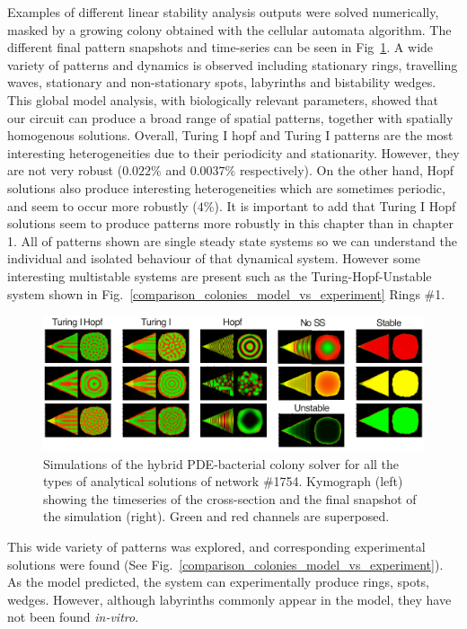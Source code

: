 Examples of different linear stability analysis outputs were solved numerically, masked by a growing colony obtained with the cellular automata algorithm.
The different final pattern snapshots and time-series can be seen in Fig~\ref{system_class_simulations}.
A wide variety of patterns and dynamics is observed including stationary rings, travelling waves, stationary and non-stationary spots, labyrinths and bistability wedges.
This global model analysis, with biologically relevant parameters, showed that our circuit can produce a broad range of spatial patterns, together with spatially homogenous solutions.
Overall, Turing I hopf and Turing I patterns are the most interesting heterogeneities due to their periodicity and stationarity.
However, they are not very robust ($0.022\%$ and $0.0037\%$ respectively).
On the other hand, Hopf solutions also produce interesting heterogeneities which are sometimes periodic, and seem to occur more robustly ($4\%$).
It is important to add that Turing I Hopf solutions seem to produce patterns more robustly in this chapter than in chapter 1. %
All of patterns shown are single steady state systems so we can understand the individual and isolated behaviour of that dynamical system.
However some interesting multistable systems are present such as the Turing-Hopf-Unstable system shown in Fig.~\ref{comparison_colonies_model_vs_experiment} Rings \#1.
\begin{figure}[H]
    \centering

    \includegraphics[width=1\textwidth]{chapters/Chapter 3/system_class_simulations}
    \caption{Simulations of the hybrid PDE-bacterial colony solver for all the types of analytical solutions of network \#1754. Kymograph (left) showing the timeseries of the cross-section and the final snapshot of the simulation (right). Green and red channels are superposed. }
    \label{system_class_simulations}
\end{figure}


This wide variety of patterns was explored, and corresponding experimental solutions were found (See Fig.~\ref{comparison_colonies_model_vs_experiment}).
As the model predicted, the system can experimentally produce rings, spots, wedges.
However, although labyrinths commonly appear in the model, they have not been found \textit{in-vitro}.


